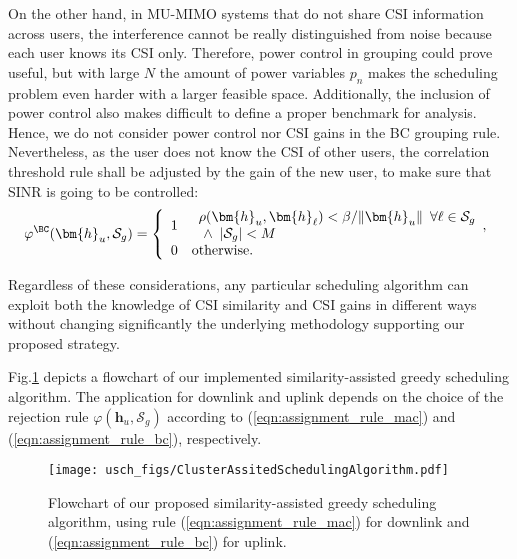 On the other hand, in MU-MIMO systems that do not share CSI information across users, the interference cannot be really distinguished from noise because each user knows its CSI only. Therefore, power control in grouping could prove useful, but with large $N$ the amount of power variables $p_n$ makes the scheduling problem even harder with a larger feasible space. Additionally, the inclusion of power control also makes difficult to define a proper benchmark for analysis. Hence, we do not consider power control nor CSI gains in the BC grouping rule. Nevertheless, as the user does not know the CSI of other users, the correlation threshold rule shall be adjusted by the gain of the new user, to make sure that SINR is going to be controlled:
\begin{align}
	\varphi^{\BC}(\bm{h}_u,\mathcal{S}_g)=\left\{\begin{array}{ll}1&
		\begin{array}{l}\rho(\bm{h}_u,\bm{h}_{\ell})<\beta/\|\bm{h}_u\|\,\,\,\forall \ell\in\mathcal{S}_g\\
			\,\,\wedge\,\,\, |\mathcal{S}_g|<M\end{array},\\
		0&\text{otherwise.}\end{array}\right.
	\label{eqn:assignment_rule_bc}
\end{align}

Regardless of these considerations, any particular scheduling algorithm can exploit both the knowledge of CSI similarity and CSI gains in different ways without changing significantly the underlying methodology supporting our proposed strategy.

Fig.\ref{fig:similarity_assisted_scheduling} depicts a flowchart of our implemented similarity-assisted greedy scheduling algorithm. The application for downlink and uplink depends on the choice of the rejection rule $\varphi(\bm{h}_u,\mathcal{S}_g)$ according to (\ref{eqn:assignment_rule_mac}) and (\ref{eqn:assignment_rule_bc}), respectively.
\begin{figure}[tbp]
	\centering
	\texttt{[image: usch\_figs/ClusterAssitedSchedulingAlgorithm.pdf]}
	\caption{Flowchart of our proposed similarity-assisted greedy scheduling algorithm, using rule (\ref{eqn:assignment_rule_mac}) for downlink and (\ref{eqn:assignment_rule_bc}) for uplink.}
	\label{fig:similarity_assisted_scheduling}
\end{figure}

